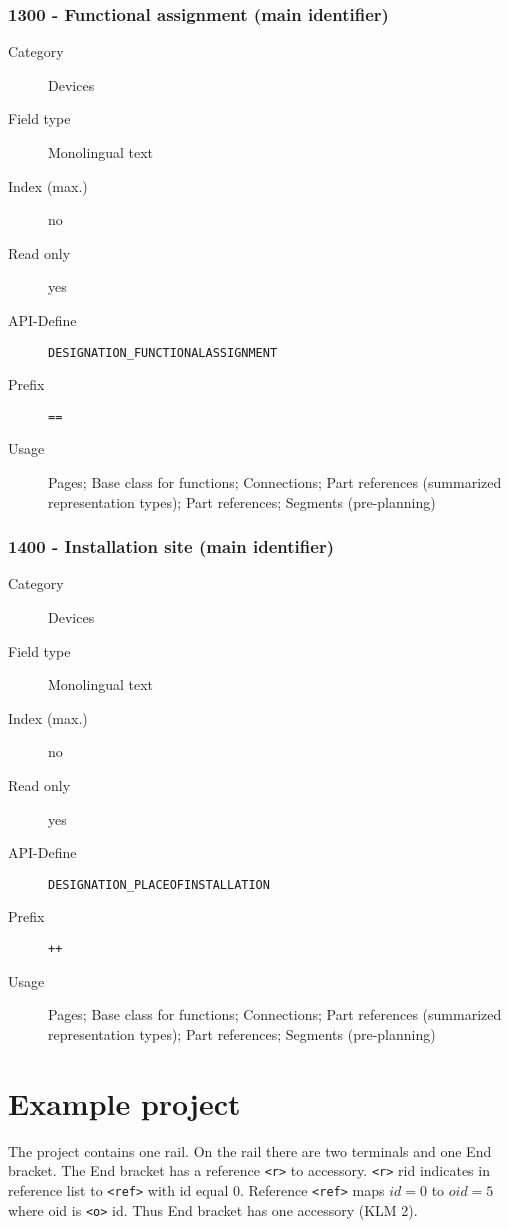 \documentclass[%
	a4paper,
	oneside,
	listof=numbered,
	parskip=half,
	headsepline=true,
	footsepline=false,
	0.7headlines,
	]{scrbook}
\begin{document}
\subsection{1300 - Functional assignment (main identifier)}

\begin{description}
	\item[Category] Devices
	\item[Field type] Monolingual text
	\item[Index (max.)] no
	\item[Read only] yes
	\item[API-Define] \verb|DESIGNATION_FUNCTIONALASSIGNMENT|
	\item[Prefix] \verb|==|
	\item[Usage] Pages; Base class for functions; Connections; Part references (summarized representation types); Part references; Segments (pre-planning)
\end{description}

\subsection{1400 - Installation site (main identifier)}

\begin{description}
	\item[Category] Devices
	\item[Field type] Monolingual text
	\item[Index (max.)] no
	\item[Read only] yes
	\item[API-Define] \verb|DESIGNATION_PLACEOFINSTALLATION|
	\item[Prefix] \verb|++|
	\item[Usage] Pages; Base class for functions; Connections; Part references (summarized representation types); Part references; Segments (pre-planning)
\end{description}

\chapter{Example project}



The project contains one rail.
On the rail there are two terminals and one End bracket.
The End bracket has a reference \verb|<r>| to accessory.
\verb|<r>| rid indicates in reference list to \verb|<ref>| with id equal $0$.
Reference \verb|<ref>| maps $id=0$ to $oid=5$ where oid is \verb|<o>| id.
Thus End bracket has one accessory (KLM 2).
\end{document}
